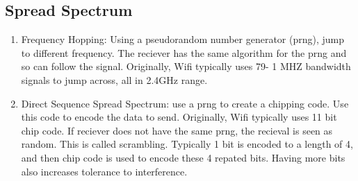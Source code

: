 \documentclass[12pt]{book}
\begin{document}
\subsection{Spread Spectrum}
\begin{enumerate}
    \item Frequency Hopping: Using a pseudorandom number generator (prng), jump to different frequency. The reciever has the same algorithm for the prng and so can follow the signal. Originally, Wifi typically uses 79- 1 MHZ bandwidth signals to jump across, all in 2.4GHz range.
    \item Direct Sequence Spread Spectrum: use a prng to create a chipping code. Use this code to encode the data to send. Originally, Wifi typically uses 11 bit chip code. If reciever does not have the same prng, the recieval is seen as random. This is called scrambling. Typically 1 bit is encoded to a length of 4, and then chip code is used to encode these 4 repated bits. Having more bits also increases tolerance to interference.
\end{enumerate}
\end{document}
